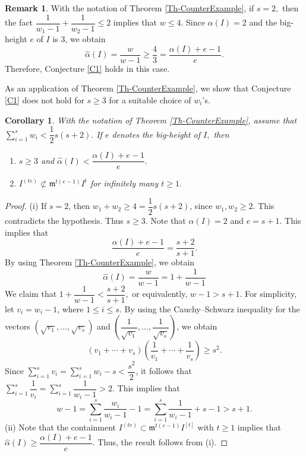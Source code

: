 \documentclass[12pt,reqno]{amsart}
\newtheorem{corollary}[thm]{Corollary}
\theoremstyle{definition}
\newtheorem{remark}[thm]{Remark}
\newcommand{\mi}{\mathfrak{m}}
\newcommand{\ww}{\widehat{\alpha}}
\numberwithin{equation}{section}
\begin{document}
\begin{remark}
    With the notation of Theorem \ref{Th-CounterExample}, if $s = 2,$ then the fact $\dfrac{1}{w_1 - 1} + \dfrac{1}{w_2 - 1} \le 2$ implies that $w \le 4$. Since $\alpha(I) = 2$ and the big-height $e$ of $I$ is 3,  we obtain
    \[\ww(I) = \dfrac{w}{w - 1} \geq \dfrac{4}{3}=\dfrac{\alpha(I) + e - 1}{e}.\] Therefore, Conjecture \ref{C1} holds in this case.
\end{remark}

As an application of Theorem \ref{Th-CounterExample}, we show that Conjecture \ref{C1} does not hold for $s \geq 3$ for a suitable choice of $w_i$'s. 
\begin{corollary}\label{C-CounterExample}
   With the notation of Theorem \ref{Th-CounterExample}, assume that $\sum_{i = 1}^{s} w_i < \dfrac{1}{2} s(s + 2).$ If $e$ denotes the big-height of $I,$ then 
   \begin{enumerate}[\rm(i)]
       \item $s \ge 3$  and $\ww(I) < \dfrac{\alpha(I) + e - 1}{e}.$
       \item $I^{(te)} \not\subset \mi^{t(e - 1)} I^{t}$  for infinitely many $t \ge 1.$
   \end{enumerate}
\end{corollary}

\begin{proof}
    (i) If $s = 2$, then $w_1 + w_2 \ge 4 = \dfrac{1}{2} s(s + 2)$, since $w_1, w_2 \ge 2.$ This contradicts the hypothesis. Thus $s \ge 3.$ Note that $\alpha(I) = 2$ and $e = s + 1.$ This implies that 
    \[\dfrac{\alpha(I) + e - 1}{e} = \dfrac{s + 2}{s + 1}.\]
    By using Theorem \ref{Th-CounterExample}, we obtain
    \[\ww(I) = \dfrac{w}{w - 1} = 1 + \dfrac{1}{w - 1} \] We claim that $1 + \dfrac{1}{w - 1} < \dfrac{s + 2}{s + 1},$ or equivalently, $w - 1 > s + 1.$
    For simplicity, let $v_i = w_i - 1$, where $1 \le i \le s.$ By using the Cauchy--Schwarz inequality for the vectors $\left( \sqrt{v_1}, \ldots, \sqrt{v_s} \right)$ and $\left( \dfrac{1}{\sqrt{v_1}}, \ldots, \dfrac{1}{\sqrt{v_s}} \right)$, we obtain
    \[\left( v_1 + \cdots + v_s \right) \left( \dfrac{1}{v_1} + \cdots + \dfrac{1}{v_s} \right) \ge s^2.\]
    Since $\sum_{i = 1}^{s} v_i = \sum_{i = 1}^{s} w_i - s < \dfrac{s^2}{2}$, it follows that $\sum_{i = 1}^{s} \dfrac{1}{v_i} = \sum_{i = 1}^{s} \dfrac{1}{w_i - 1} > 2.$ This implies  that
    \[w - 1 = \sum_{i = 1}^{s} \dfrac{w_i}{w_i - 1} - 1 = \sum_{i = 1}^{s} \dfrac{1}{w_i - 1} + s - 1 > s + 1.\]
    (ii) Note that the containment $I^{(te)} \subset \mi^{t(e - 1)} I^{[t]}$ with $t \ge 1$ implies that $\ww(I) \ge \dfrac{\alpha(I) + e - 1}{e}.$  Thus, the result follows from (i). 
\end{proof}  
\end{document}
